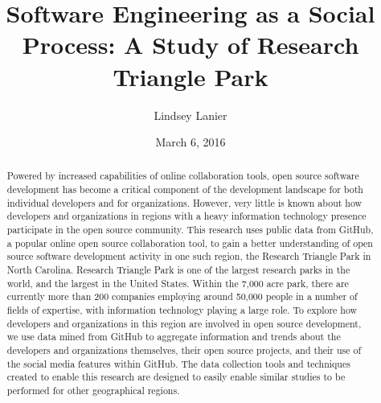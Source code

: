 \documentclass{ecuthesis}
\title{Software Engineering as a Social Process: A Study of Research Triangle Park}
\author{Lindsey Lanier}
\date{March 6, 2016}
\begin{document}
\begin{abstract}
\noindent Powered by increased capabilities of online collaboration tools, open source software development has become a critical component of the development landscape for both individual developers and for organizations. However, very little is known about how developers and organizations in regions with a heavy information technology presence participate in the open source community. This research uses public data from GitHub, a popular online open source collaboration tool, to gain a better understanding of open source software development activity in one such region, the Research Triangle Park in North Carolina. Research Triangle Park is one of the largest research parks in the world, and the largest in the United States. Within the 7,000 acre park, there are currently more than 200 companies employing around 50,000 people in a number of fields of expertise, with information technology playing a large role. To explore how developers and organizations in this region are involved in open source development, we use data mined from GitHub to aggregate information and trends about the developers and organizations themselves, their open source projects, and their use of the social media features within GitHub. The data collection tools and techniques created to enable this research are designed to easily enable similar studies to be performed for other geographical regions.
\end{abstract}

\coversheet

\maketitle
\makecopyright
\makesignature
\tableofcontents
\listoftables
\listoffigures

\chapters













\coversheet
\end{document}
